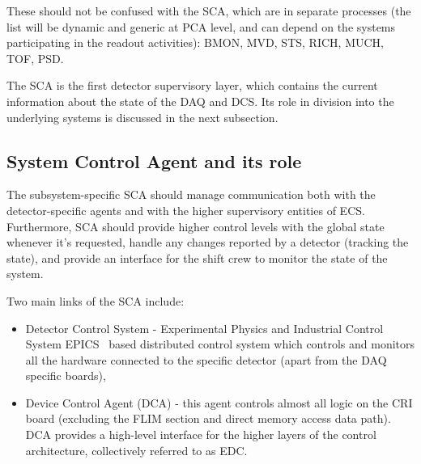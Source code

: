 These should not be confused with the \gls{SCA}, which are in separate processes (the list will be dynamic and generic at \gls{PCA} level, and can depend on the systems participating in the readout activities): \gls{BMON}, \gls{MVD}, \gls{STS}, \gls{RICH}, \gls{MUCH}, \gls{TOF}, \gls{PSD}. 

The SCA is the first detector supervisory layer, which contains the current information about the state of the \gls{DAQ} and \gls{DCS}. Its role in division into the underlying systems is discussed in the next subsection.

\subsection{System Control Agent and its role}
The subsystem-specific \gls{SCA} should manage communication both with the detector-specific agents and with the higher supervisory entities of \gls{ECS}. Furthermore, \gls{SCA} should provide higher control levels with the global state whenever it's requested, handle any changes reported by a detector (tracking the state), and provide an interface for the shift crew to monitor the state of the system. 

Two main links of the \gls{SCA} include:
\begin{itemize}
    \item Detector Control System - Experimental Physics and Industrial Control System \gls{EPICS}~\cite{EPICS} based distributed control system which controls and monitors all the hardware connected to the specific detector (apart from the \gls{DAQ} specific boards),
    \item Device Control Agent (\gls{DCA}) - this agent controls almost all logic on the \gls{CRI} board (excluding the \gls{FLIM} section and direct memory access data path). \gls{DCA} provides a high-level interface for the higher layers of the control architecture, collectively referred to as \gls{EDC}. 
\end{itemize}











